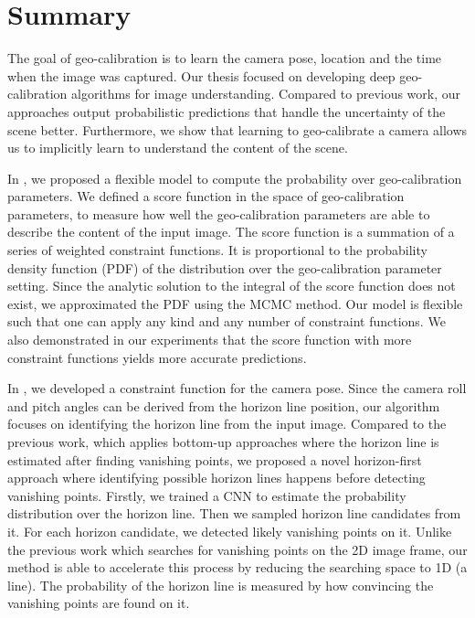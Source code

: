 \chapter{Summary}
\label{chap:discussion}

The goal of geo-calibration is to learn the camera pose, location and
the time when the image was captured.
Our thesis focused on developing deep geo-calibration algorithms for
image understanding.
Compared to previous work, our approaches output probabilistic
predictions that handle the uncertainty of the scene
better. Furthermore, we show that
learning to geo-calibrate a camera allows us to implicitly learn to
understand the content of the scene.


In , we proposed a flexible model to compute the
probability over geo-calibration parameters. We defined a score
function in the space of geo-calibration parameters, to measure how
well the geo-calibration parameters are able to describe the content
of the input image.
The score function is a summation of a series of weighted
constraint functions. It is proportional to the probability density
function (PDF) of the distribution over the geo-calibration parameter setting.
Since the analytic solution to the
integral of the score function does not exist, we approximated the
PDF using the MCMC method. Our model is flexible such that one can apply
any kind and any number of constraint functions.
We also demonstrated in our experiments that the score function with more
constraint functions yields more accurate predictions.

In , we developed a constraint function for the
camera pose. Since the camera roll and pitch angles can be derived from
the horizon line position, our algorithm focuses on identifying the
horizon line from the input image.
Compared to the previous work, which applies bottom-up
approaches where the horizon line is estimated after finding vanishing
points, we proposed a novel horizon-first approach where
identifying possible horizon lines happens before detecting vanishing
points. 
Firstly, we trained a CNN to estimate the probability distribution
over the horizon line. Then we sampled horizon line candidates from
it. For each horizon candidate, we detected likely
vanishing points on it. Unlike the previous work which searches for
vanishing points on the 2D image frame, our method is able to
accelerate this process by reducing the searching space to
1D (a line). The probability of the horizon line is measured by how
convincing the vanishing points are found on it. 

